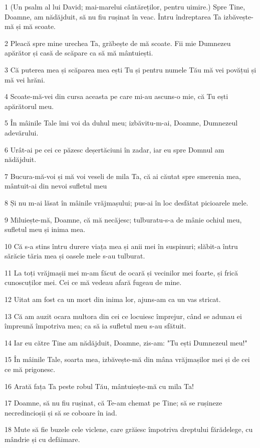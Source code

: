 \par 1 (Un psalm al lui David; mai-marelui cântăreților, pentru uimire.) Spre Tine, Doamne, am nădăjduit, să nu fiu rușinat în veac. Întru îndreptarea Ta izbăvește-mă și mă scoate.
\par 2 Pleacă spre mine urechea Ta, grăbește de mă scoate. Fii mie Dumnezeu apărător și casă de scăpare ca să mă mântuiești.
\par 3 Că puterea mea și scăparea mea ești Tu și pentru numele Tău mă vei povățui și mă vei hrăni.
\par 4 Scoate-mă-vei din cursa aceasta pe care mi-au ascuns-o mie, că Tu ești apărătorul meu.
\par 5 În mâinile Tale îmi voi da duhul meu; izbăvitu-m-ai, Doamne, Dumnezeul adevărului.
\par 6 Urât-ai pe cei ce păzesc deșertăciuni în zadar, iar eu spre Domnul am nădăjduit.
\par 7 Bucura-mă-voi și mă voi veseli de mila Ta, că ai căutat spre smerenia mea, mântuit-ai din nevoi sufletul meu
\par 8 Și nu m-ai lăsat în mâinile vrăjmașului; pus-ai în loc desfătat picioarele mele.
\par 9 Miluiește-mă, Doamne, că mă necăjesc; tulburatu-s-a de mânie ochiul meu, sufletul meu și inima mea.
\par 10 Că s-a stins întru durere viața mea și anii mei în suspinuri; slăbit-a întru sărăcie tăria mea și oasele mele s-au tulburat.
\par 11 La toți vrăjmașii mei m-am făcut de ocară și vecinilor mei foarte, și frică cunoscuților mei. Cei ce mă vedeau afară fugeau de mine.
\par 12 Uitat am fost ca un mort din inima lor, ajuns-am ca un vas stricat.
\par 13 Că am auzit ocara multora din cei ce locuiesc împrejur, când se adunau ei împreună împotriva mea; ca să ia sufletul meu s-au sfătuit.
\par 14 Iar eu către Tine am nădăjduit, Doamne, zis-am: "Tu ești Dumnezeul meu!"
\par 15 În mâinile Tale, soarta mea, izbăvește-mă din mâna vrăjmașilor mei și de cei ce mă prigonesc.
\par 16 Arată fața Ta peste robul Tău, mântuiește-mă cu mila Ta!
\par 17 Doamne, să nu fiu rușinat, că Te-am chemat pe Tine; să se rușineze necredincioșii și să se coboare în iad.
\par 18 Mute să fie buzele cele viclene, care grăiesc împotriva dreptului fărădelege, cu mândrie și cu defăimare.
